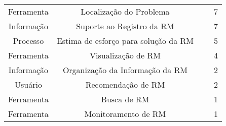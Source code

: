 \begin{table}[htbp]
{\begin{tabular}{|c|c|l|c|}
\multirow{3}{*}{Ferramenta}   & \multirow{3}{*}{Localização do Problema}      & \cite{Bangcharoensap:2012:LSC:2419061.2419428,corley2011recovering,Nguyen:2012:MAR:2393596.2393671}      & \multirow{3}{*}{7}  \\
                              &                                               & \cite{Thung:2014:BIT:2635868.2661678,Wong:2014:BBF:2705615.2706096}                                      &                     \\
                              &                                               & \cite{Romo:2015:TAT:2745802.2745833,thung2013automatic}                                                  &                     \\ \hline
\multirow{2}{*}{Informação}   & \multirow{2}{*}{Suporte ao Registro da RM}    & \cite{Bettenburg2008a,Correa2013b,moran2015auto,Moran:2015:EAA:2786805.2807557}                          & \multirow{2}{*}{7}  \\
                              &                                               & \cite{Tu:2014:MQI:2677832.2677844,White:2015:GRR:2820282.2820291,Wu2011a}                                &                     \\ \hline
\multirow{2}{*}{Processo}     & \multirow{2}{*}{Estima de esforço para solução
    da RM}      & \cite{Bhattacharya:2011:BTP:1985441.1985472,Nagwani2010,thung2012would}                                  & \multirow{2}{*}{5}  \\
                              &                                               & \cite{Vijayakumar2014,xia2015automatic}                                                                  &                     \\ \hline
Ferramenta                    & Visualização de RM                            & \cite{dal2013closer,dal2014bug,hora2012bug,takama2013application}                                        & 4                   \\ \hline
Informação                    & Organização da Informação da RM               & \cite{mani2012ausum,otoom2016severity}                                                                   & 2                   \\ \hline
Usuário                       & Recomendação de RM                            & \cite{malheiros2012source,Wang2011bug}                                                                   & 2                   \\ \hline
Ferramenta                   & Busca de RM                                   & \cite{liu2014faceted}                                                                                    & 1                   \\ \hline
Ferramenta                    & Monitoramento de RM                           &~\cite{Aggarwal:2014:MIT:2593801.2593810}                                                                 & 1                   \\ \hline
\end{tabular}%
}
\end{table}
